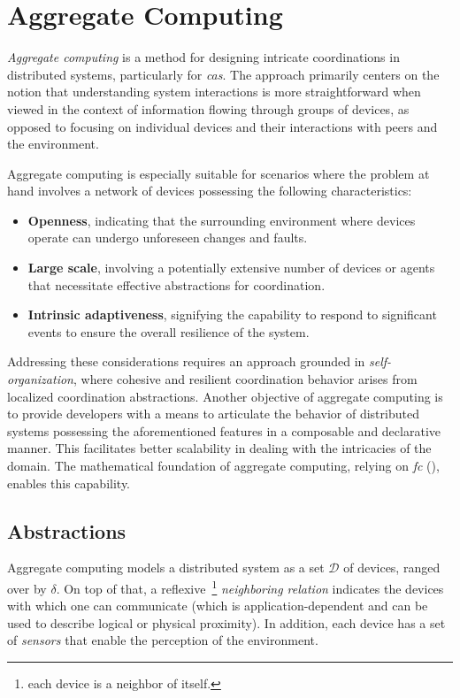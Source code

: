\section{Aggregate Computing}

\textit{Aggregate computing} is a method for designing intricate coordinations in distributed systems, particularly for \textit{\ac{cas}}. The approach primarily centers on the notion that understanding system interactions is more straightforward when viewed in the context of information flowing through groups of devices, as opposed to focusing on individual devices and their interactions with peers and the environment.~\cite{Viroli2019}

Aggregate computing is especially suitable for scenarios where the problem at hand involves a network of devices possessing the following characteristics:

\begin{itemize}
    \item \textbf{Openness}, indicating that the surrounding environment where devices operate can undergo unforeseen changes and faults.
    \item \textbf{Large scale}, involving a potentially extensive number of devices or agents that necessitate effective abstractions for coordination.
    \item \textbf{Intrinsic adaptiveness}, signifying the capability to respond to significant events to ensure the overall resilience of the system.
\end{itemize}

Addressing these considerations requires an approach grounded in \textit{self-organization}, where cohesive and resilient coordination behavior arises from localized coordination abstractions. Another objective of aggregate computing is to provide developers with a means to articulate the behavior of distributed systems possessing the aforementioned features in a composable and declarative manner. This facilitates better scalability in dealing with the intricacies of the domain. The mathematical foundation of aggregate computing, relying on \textit{\ac{fc}} (), enables this capability.

\subsection{Abstractions}
\label{subsection:abstractions}

Aggregate computing models a distributed system as a set $\mathcal{D}$ of devices, ranged over by $\delta$. On top of that, a reflexive~\footnote{each device is a neighbor of itself.} \textit{neighboring relation} indicates the devices with which one can communicate (which is application-dependent and can be used to describe logical or physical proximity). In addition, each device has a set of \textit{sensors} that enable the perception of the environment.

